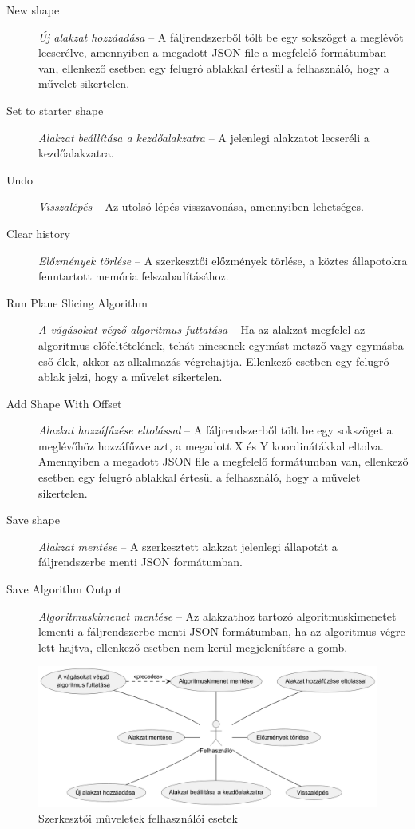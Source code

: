 \begin{description}
    \item[New shape] \textit{Új alakzat hozzáadása} -- A fáljrendszerből tölt be egy sokszöget a meglévőt lecserélve, amennyiben a megadott JSON file a megfelelő formátumban van, ellenkező esetben egy felugró ablakkal értesül a felhasználó, hogy a művelet sikertelen.
    \item[Set to starter shape] \textit{Alakzat beállítása a kezdőalakzatra} -- A jelenlegi alakzatot lecseréli a kezdőalakzatra.
    \item[Undo] \textit{Visszalépés} -- Az utolsó lépés visszavonása, amennyiben lehetséges.
    \item[Clear history] \textit{Előzmények törlése} -- A szerkesztői előzmények törlése, a köztes állapotokra fenntartott memória felszabadításához.
    \item[Run Plane Slicing Algorithm] \textit{A vágásokat végző algoritmus futtatása} -- Ha az alakzat megfelel az algoritmus előfeltételének, tehát nincsenek egymást metsző vagy egymásba eső élek, akkor az alkalmazás végrehajtja. Ellenkező esetben egy felugró ablak jelzi, hogy a művelet sikertelen.
    \item[Add Shape With Offset] \textit{Alazkat hozzáfűzése eltolással} -- A fáljrendszerből tölt be egy sokszöget a meglévőhöz hozzáfűzve azt, a megadott X és Y koordinátákkal eltolva. Amennyiben a megadott JSON file a megfelelő formátumban van, ellenkező esetben egy felugró ablakkal értesül a felhasználó, hogy a művelet sikertelen.
    \item[Save shape] \textit{Alakzat mentése} -- A szerkesztett alakzat jelenlegi állapotát a fáljrendszerbe menti JSON formátumban.
    \item[Save Algorithm Output] \textit{Algoritmuskimenet mentése} -- Az alakzathoz tartozó algoritmuskimenetet lementi a fáljrendszerbe menti JSON formátumban, ha az algoritmus végre lett hajtva, ellenkező esetben nem kerül megjelenítésre a gomb.
\end{description}

\begin{figure}[H]
    \centering
    \includegraphics[width=1\linewidth]{images/usecase_editor_actions.png}
    \caption{Szerkesztői műveletek felhasználói esetek}
    \label{fig:usecase_editor_actions-1}
\end{figure}

